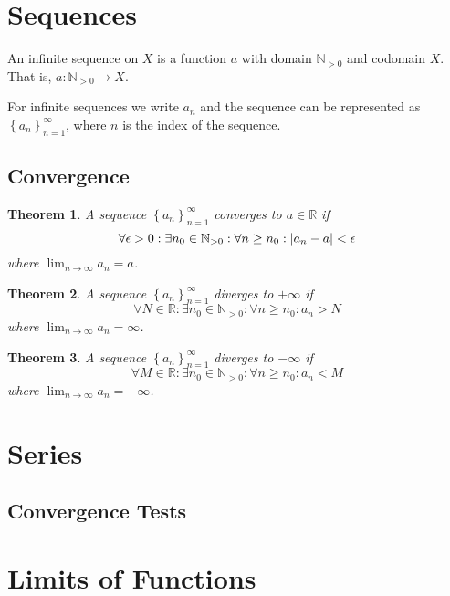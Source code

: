 \documentclass{article}
\theoremstyle{plain}
\newtheorem{theorem}{Theorem}[section]
\numberwithin{theorem}{section}
\theoremstyle{definition}
\numberwithin{definition}{section}
\newcommand*{\N}{\mathbb{N}}
\newcommand*{\R}{\mathbb{R}}
\begin{document}
\section{Sequences}
An infinite sequence on $X$ is a function $a$ with domain $\N_{> 0}$ and codomain $X$. That is, $a:\N_{> 0}\rightarrow X$.

For infinite sequences we write $a_n$ and the sequence can be represented as $\left\{a_n\right\}_{n=1}^\infty$, where $n$ is the index of the sequence.
%
\subsection{Convergence}
\begin{theorem}
	A sequence $\left\{a_n\right\}_{n=1}^\infty$ converges to $a\in \R$ if
	\begin{equation*}
		\forall \epsilon > 0 : \exists n_0 \in \N_{> 0}:\forall n \geq n_0 : \abs{a_n - a} < \epsilon
	\end{equation*}
	where $\lim_{n \rightarrow \infty}a_n = a$.
\end{theorem}
%
\begin{theorem}
	A sequence $\left\{a_n\right\}_{n=1}^\infty$ diverges to $+\infty$ if
	\begin{equation*}
		\forall N \in \R : \exists n_0 \in \N_{> 0}:\forall n \geq n_0 : a_n > N
	\end{equation*}
	where $\lim_{n \rightarrow \infty}a_n = \infty$.
\end{theorem}
%
\begin{theorem}
	A sequence $\left\{a_n\right\}_{n=1}^\infty$ diverges to $-\infty$ if
	\begin{equation*}
		\forall M \in \R : \exists n_0 \in \N_{> 0}:\forall n \geq n_0 : a_n < M
	\end{equation*}
	where $\lim_{n \rightarrow \infty}a_n = -\infty$.
\end{theorem}

%
\section{Series}

%
\subsection{Convergence Tests}

%
\section{Limits of Functions}
\end{document}
